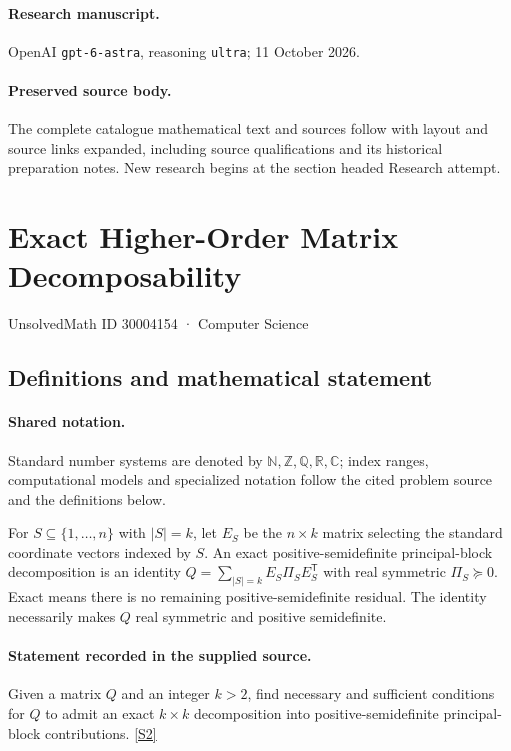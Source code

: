\documentclass[11pt]{article}
\begin{document}
\paragraph{Research manuscript.} OpenAI \texttt{gpt-6-astra}, reasoning \texttt{ultra}; 11 October 2026.
\paragraph{Preserved source body.} The complete catalogue mathematical text and sources follow with layout and source links expanded, including source qualifications and its historical preparation notes. New research begins at the section headed Research attempt.

\section{Exact Higher-Order Matrix Decomposability}\label{30004154}
{\small UnsolvedMath ID 30004154 · Computer Science}
\subsection{Definitions and mathematical statement}

\paragraph{Shared notation.}Standard number systems are denoted by $\mathbb N,\mathbb Z,\mathbb Q,\mathbb R,\mathbb C$; index ranges, computational models and specialized notation follow the cited problem source and the definitions below.


For $S\subseteq\{1,\ldots,n\}$ with $|S|=k$, let $E_S$ be the $n\times k$ matrix selecting the standard coordinate vectors indexed by $S$. An exact positive-semidefinite principal-block decomposition is an identity $Q=\sum_{|S|=k}E_S\Pi_SE_S^{\mathsf T}$ with real symmetric $\Pi_S\succeq0$. Exact means there is no remaining positive-semidefinite residual. The identity necessarily makes $Q$ real symmetric and positive semidefinite.
\paragraph{Statement recorded in the supplied source.}
Given a matrix $Q$ and an integer $k>2$, find necessary and sufficient conditions for $Q$ to admit an exact $k\times k$ decomposition into positive-semidefinite principal-block contributions. \href{https://doi.org/10.4171/owr/2019/26}{[S2]}
\end{document}
